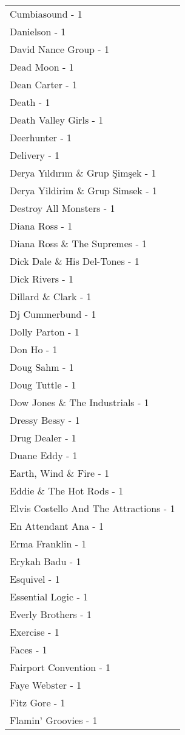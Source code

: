 \documentclass[
]{article}
\begin{document}
\begin{longtable}{l}
Cumbiasound - 1 \\ 
Danielson - 1 \\ 
David Nance Group - 1 \\ 
Dead Moon - 1 \\ 
Dean Carter - 1 \\ 
Death - 1 \\ 
Death Valley Girls - 1 \\ 
Deerhunter - 1 \\ 
Delivery - 1 \\ 
Derya Yıldırım \& Grup Şimşek - 1 \\ 
Derya Yildirim \& Grup Simsek - 1 \\ 
Destroy All Monsters - 1 \\ 
Diana Ross - 1 \\ 
Diana Ross \& The Supremes - 1 \\ 
Dick Dale \& His Del-Tones - 1 \\ 
Dick Rivers - 1 \\ 
Dillard \& Clark - 1 \\ 
Dj Cummerbund - 1 \\ 
Dolly Parton - 1 \\ 
Don Ho - 1 \\ 
Doug Sahm - 1 \\ 
Doug Tuttle - 1 \\ 
Dow Jones \& The Industrials - 1 \\ 
Dressy Bessy - 1 \\ 
Drug Dealer - 1 \\ 
Duane Eddy - 1 \\ 
Earth, Wind \& Fire - 1 \\ 
Eddie \& The Hot Rods - 1 \\ 
Elvis Costello And The Attractions - 1 \\ 
En Attendant Ana - 1 \\ 
Erma Franklin - 1 \\ 
Erykah Badu - 1 \\ 
Esquivel - 1 \\ 
Essential Logic - 1 \\ 
Everly Brothers - 1 \\ 
Exercise - 1 \\ 
Faces - 1 \\ 
Fairport Convention - 1 \\ 
Faye Webster - 1 \\ 
Fitz Gore - 1 \\ 
Flamin’ Groovies - 1 \\ 

\end{longtable}
\end{document}
